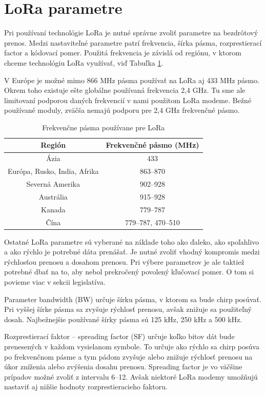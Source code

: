\documentclass[slovak,master]{diploma}
\begin{document}
\newpage
\section{LoRa parametre}
Pri používaní technológie LoRa je nutné správne zvoliť parametre na bezdrôtový prenos. Medzi nastaviteľné parametre patrí frekvencia, šírka pásma, rozprestierací factor a kódovací pomer.
Použitá frekvencia je závislá od regiónu, v ktorom chceme technológiu LoRa využívať, viď Tabuľka \ref{tab:ismBands}. 

V Európe je možné mimo 866 MHz pásma používať na LoRa aj 433 MHz pásmo. Okrem toho existuje ešte globálne používaná frekvencia 2,4 GHz. Tu sme ale limitovaní 
podporou daných frekvencií v nami použitom LoRa modeme. Bežné používané moduly, zväčša nemajú podporu pre 2,4 GHz frekvenčné pásmo.

\begin{table}[h!]
	\centering
  \small
  \setlength\tabcolsep{6pt}
	\caption[Frekvenčne pásma používane pre LoRa]{Frekvenčne pásma používane pre LoRa}
  \begin{tabular}{c|c}
    \toprule
    Región & Frekvenčné pásmo (MHz)\\
    \midrule
    Ázia & 433 \\
    Európa, Rusko, India, Afrika & 863--870 \\
    Severná Amerika & 902--928 \\
    Austrália & 915--928 \\
    Kanada & 779--787 \\
    Čína & 779--787, 470--510 \\
    \midrule
  \end{tabular}
  \label{tab:ismBands}
\end{table}
\newpage

Ostatné LoRa parametre sú vyberané na základe toho ako ďaleko, ako spoľahlivo a ako rýchlo je potrebné dáta prenášať. Je nutné zvoliť vhodný kompromis medzi rýchlosťou prenosu 
a dosahom prenosu. Pri výbere parametrov je ale taktiež potrebné dbať na to, aby nebol prekročený povolený kľučovací pomer. O tom si povieme viac v sekcii legislatíva.

Parameter bandwidth (BW) určuje šírku pásma, v ktorom sa bude chirp posúvať. Pri vyššej šírke pásma sa zvyšuje rýchlosť prenosu, avšak znižuje sa použiteľný dosah.
Najbežnejšie používané šírky pásma sú 125 kHz, 250 kHz a 500 kHz.

Rozprestierací faktor -- spreading factor (SF) určuje koľko bitov dát bude prenesených v každom vysielanom symbole. To určuje ako rýchlo sa chirp posúva po frekvenčnom pásme a tym pádom 
zvyšuje alebo znižuje rýchlosť prenosu na úkor zníženia alebo zvýšenia dosahu prenosu. Spreading factor je vo väčšine prípadov možné zvoliť z intervalu 6--12. 
Avšak niektoré LoRa modemy umožňujú nastaviť aj nižšie hodnoty rozprestieracieho faktoru. 
\end{document}
